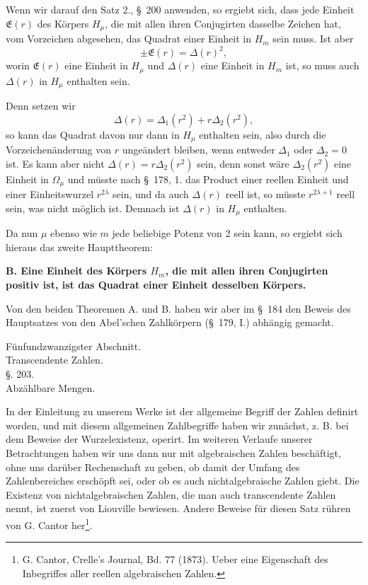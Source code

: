 \documentclass[11pt]{article}
\begin{document}
Wenn wir darauf den Satz 2., \S~200 anwenden, so ergiebt sich, dass jede Einheit $\mathfrak E(r)$ des Körpers $H_\mu$, die mit allen ihren Conjugirten dasselbe Zeichen hat, vom Vorzeichen abgesehen, das Quadrat einer Einheit in $H_m$ sein muss. Ist aber
\[
\pm\mathfrak E(r)=\Delta(r)^2,
\]
worin $\mathfrak E(r)$ eine Einheit in $H_\mu$ und $\Delta(r)$ eine Einheit in $H_m$ ist, so muss auch $\Delta(r)$ in $H_\mu$ enthalten sein.

Denn setzen wir
\[
\Delta(r)=\Delta_1(r^2)+r\Delta_2(r^2),
\]
so kann das Quadrat davon nur dann in $H_\mu$ enthalten sein, also durch die Vorzeichenänderung von $r$ ungeändert bleiben, wenn entweder $\Delta_1$ oder $\Delta_2=0$ ist. Es kann aber nicht $\Delta(r)=r\Delta_2(r^2)$ sein, denn sonst wäre $\Delta_2(r^2)$ eine Einheit in $\Omega_\mu$ und müsste
nach \S~178, 1. das Product einer reellen Einheit und einer Einheitswurzel $r^{2\lambda}$ sein, und da auch $\Delta(r)$ reell ist, so müsste $r^{2\lambda+1}$ reell sein, was nicht möglich ist. Demnach ist $\Delta(r)$ in $H_\mu$ enthalten.

Da nun $\mu$ ebenso wie $m$ jede beliebige Potenz von 2 sein kann, so ergiebt sich hieraus das zweite Haupttheorem:

\begin{center}\textbf{B. Eine Einheit des Körpers $H_m$, die mit allen ihren Conjugirten positiv ist, ist das Quadrat einer Einheit desselben Körpers.}\end{center}

Von den beiden Theoremen A. und B. haben wir aber im \S~184 den Beweis des Hauptsatzes von den Abel'schen Zahlkörpern (\S~179, I.) abhängig gemacht.

\clearpage
\begin{center}
{\large Fünfundzwanzigster Abschnitt.}\\[0.8em]
{\Large Transcendente Zahlen.}\\[1.2em]
{\large §. 203.}\\[0.4em]
{\large Abzählbare Mengen.}
\end{center}

In der Einleitung zu unserem Werke ist der allgemeine Begriff der Zahlen definirt worden, und mit diesem allgemeinen Zahlbegriffe haben wir zunächst, z. B. bei dem Beweise der Wurzelexistenz, operirt. Im weiteren Verlaufe unserer Betrachtungen haben wir uns dann nur mit algebraischen Zahlen beschäftigt, ohne uns darüber Rechenschaft zu geben, ob damit der Umfang des Zahlenbereiches erschöpft sei, oder ob es auch nichtalgebraische Zahlen giebt. Die Existenz von nichtalgebraischen Zahlen, die man auch transcendente Zahlen nennt, ist zuerst von Liouville bewiesen. Andere Beweise für diesen Satz rühren von G. Cantor her\footnote{G. Cantor, Crelle's Journal, Bd. 77 (1873). Ueber eine Eigenschaft des Inbegriffes aller reellen algebraischen Zahlen.}.
\end{document}
